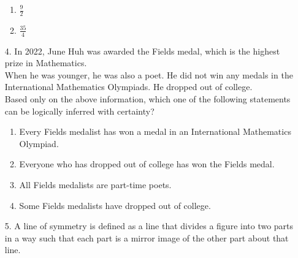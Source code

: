 \documentclass[journal]{IEEEtran}
\begin{document}
\begin{enumerate}
\begin{enumerate}[label = (\Alph*)]
        \item $\frac{9}{2}$
        \item $\frac{35}{4}$
    \end{enumerate}
    \item[4.] In 2022, June Huh was awarded the Fields medal, which is the highest prize in
    Mathematics.\\When he was younger, he was also a poet. He did not win any medals in the
    International Mathematics Olympiads. He dropped out of college.\\ Based only on the above information, which one of the following statements can be
    logically inferred with certainty?
    \begin{enumerate}[label = (\Alph*)]
        \item Every Fields medalist has won a medal in an International Mathematics Olympiad.
        \item Everyone who has dropped out of college has won the Fields medal.
        \item All Fields medalists are part-time poets.
        \item Some Fields medalists have dropped out of college.
    \end{enumerate}
    \item[5.]  A line of symmetry is defined as a line that divides a figure into two parts in a way
    such that each part is a mirror image of the other part about that line.\\


\end{enumerate}
\end{document}

